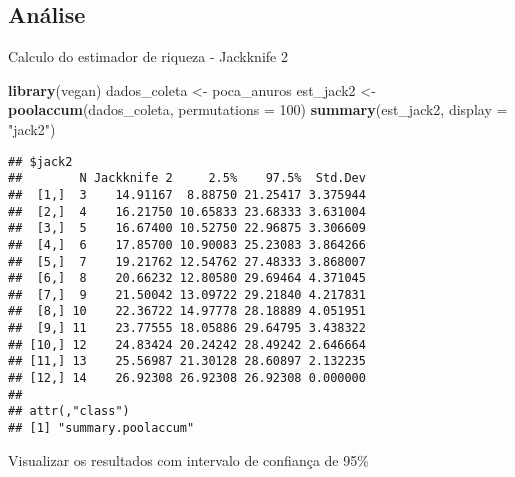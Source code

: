 \documentclass[
]{book}
\newenvironment{Shaded}{\begin{snugshade}}{\end{snugshade}}
\newcommand{\DataTypeTok}[1]{\textcolor[rgb]{0.13,0.29,0.53}{#1}}
\newcommand{\DecValTok}[1]{\textcolor[rgb]{0.00,0.00,0.81}{#1}}
\newcommand{\KeywordTok}[1]{\textcolor[rgb]{0.13,0.29,0.53}{\textbf{#1}}}
\newcommand{\NormalTok}[1]{#1}
\newcommand{\StringTok}[1]{\textcolor[rgb]{0.31,0.60,0.02}{#1}}
\begin{document}
\hypertarget{anuxe1lise-6}{%
\subsection{Análise}\label{anuxe1lise-6}}

Calculo do estimador de riqueza - Jackknife 2

\begin{Shaded}
\begin{Highlighting}[]
\KeywordTok{library}\NormalTok{(vegan)}
\NormalTok{dados_coleta <-}\StringTok{ }\NormalTok{poca_anuros}
\NormalTok{est_jack2 <-}\StringTok{ }\KeywordTok{poolaccum}\NormalTok{(dados_coleta, }\DataTypeTok{permutations =} \DecValTok{100}\NormalTok{)}
\KeywordTok{summary}\NormalTok{(est_jack2, }\DataTypeTok{display =} \StringTok{"jack2"}\NormalTok{)}
\end{Highlighting}
\end{Shaded}

\begin{verbatim}
## $jack2
##        N Jackknife 2     2.5%    97.5%  Std.Dev
##  [1,]  3    14.91167  8.88750 21.25417 3.375944
##  [2,]  4    16.21750 10.65833 23.68333 3.631004
##  [3,]  5    16.67400 10.52750 22.96875 3.306609
##  [4,]  6    17.85700 10.90083 25.23083 3.864266
##  [5,]  7    19.21762 12.54762 27.48333 3.868007
##  [6,]  8    20.66232 12.80580 29.69464 4.371045
##  [7,]  9    21.50042 13.09722 29.21840 4.217831
##  [8,] 10    22.36722 14.97778 28.18889 4.051951
##  [9,] 11    23.77555 18.05886 29.64795 3.438322
## [10,] 12    24.83424 20.24242 28.49242 2.646664
## [11,] 13    25.56987 21.30128 28.60897 2.132235
## [12,] 14    26.92308 26.92308 26.92308 0.000000
## 
## attr(,"class")
## [1] "summary.poolaccum"
\end{verbatim}

Visualizar os resultados com intervalo de confiança de 95\%
\end{document}

